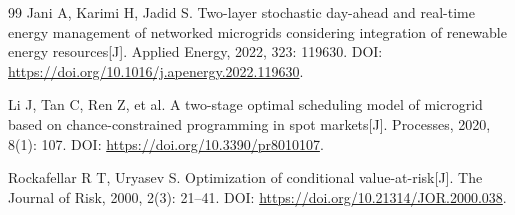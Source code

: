 \begin{thebibliography}{99}
Jani A, Karimi H, Jadid S.
Two-layer stochastic day-ahead and real-time energy management of networked microgrids considering integration of renewable energy resources[J].
Applied Energy, 2022, 323: 119630.
DOI: \url{https://doi.org/10.1016/j.apenergy.2022.119630}.

Li J, Tan C, Ren Z, et al.
A two-stage optimal scheduling model of microgrid based on chance-constrained programming in spot markets[J].
Processes, 2020, 8(1): 107.
DOI: \url{https://doi.org/10.3390/pr8010107}.

Rockafellar R T, Uryasev S.
Optimization of conditional value-at-risk[J].
The Journal of Risk, 2000, 2(3): 21--41.
DOI: \url{https://doi.org/10.21314/JOR.2000.038}.

\end{thebibliography}
